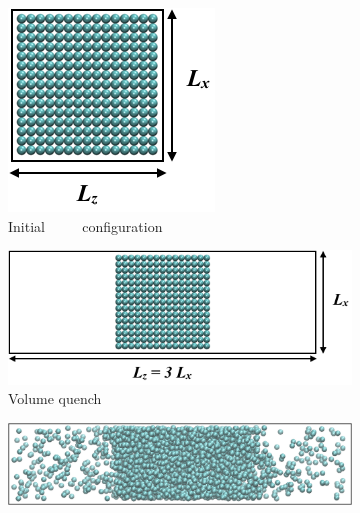 \documentclass[9pt,bestpractices]{livecoms}
\begin{document}
\begin{figure}[h]
\centering
	\begin{subfigure}{0.11\textwidth} %
    \includegraphics[width=\textwidth]{gfx/image16.png}
		\caption{Initial $\qquad$ configuration} %
	\end{subfigure}
	\begin{subfigure}{0.31\textwidth} %
    \includegraphics[width=\textwidth]{gfx/image17.png}
    \caption{Volume quench}
	\end{subfigure}
	\begin{subfigure}{0.4\textwidth} %
    \includegraphics[width=\textwidth]{gfx/image18.png}

\end{subfigure}
\end{figure}
\end{document}

